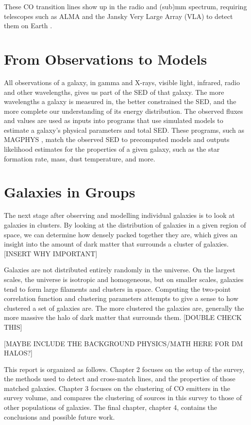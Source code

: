 \documentclass[twoside,single]{lion-msc}
\begin{document}
These CO transition lines show up in the radio and (sub)mm spectrum, requiring telescopes such as ALMA and the Jansky Very Large Array (VLA) to detect them on Earth \cite{decarli2019alma}. 

\section{From Observations to Models}

All observations of a galaxy, in gamma and X-rays, visible light, infrared, radio and other wavelengths, gives us part of the SED of that galaxy. The more wavelengths a galaxy is measured in, the better constrained the SED, and the more complete our understanding of its energy distribution. The observed fluxes and values are used as inputs into programs that use simulated models to estimate a galaxy's physical parameters and total SED. These programs, such as MAGPHYS \cite{da2008simple, da2015alma}, match the observed SED to precomputed models and outputs likelihood estimates for the properties of a given galaxy, such as the star formation rate, mass, dust temperature, and more.

\section{Galaxies in Groups}

The next stage after observing and modelling individual galaxies is to look at galaxies in clusters. By looking at the distribution of galaxies in a given region of space, we can determine how densely packed together they are, which gives an insight into the amount of dark matter that surrounds a cluster of galaxies. [INSERT WHY IMPORTANT]

Galaxies are not distributed entirely randomly in the universe. On the largest scales, the universe is isotropic and homogeneous, but on smaller scales, galaxies tend to form large filaments and clusters in space. Computing the two-point correlation function and clustering parameters attempts to give a sense to how clustered a set of galaxies are. The more clustered the galaxies are, generally the more massive the halo of dark matter that surrounds them. [DOUBLE CHECK THIS]

[MAYBE INCLUDE THE BACKGROUND PHYSICS/MATH HERE FOR DM HALOS?]

This report is organized as follows. Chapter 2 focuses on the setup of the survey, the methods used to detect and cross-match lines, and the properties of those matched galaxies. Chapter 3 focuses on the clustering of CO emitters in the survey volume, and compares the clustering of sources in this survey to those of other populations of galaxies. The final chapter, chapter 4, contains the conclusions and possible future work. 
\end{document}
